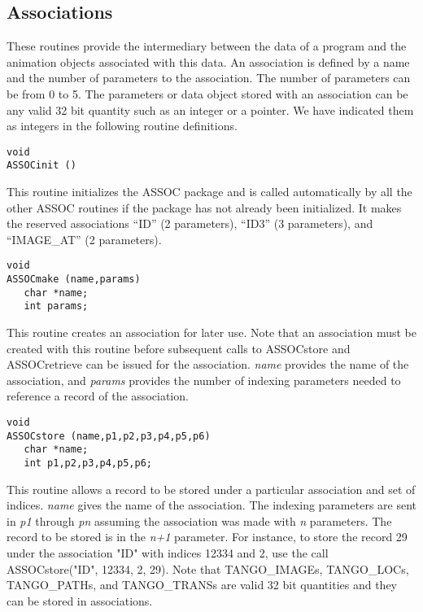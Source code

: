 \subsection{Associations}
These routines provide the intermediary between the data of a program and the
animation objects associated with this data.  An association is defined by a
name and the number of parameters to the association.  The number of
parameters can be from 0 to 5.  The parameters or data object stored
with an association can be any valid 32 bit quantity such as an integer or a
pointer.  We have indicated them as integers in the following routine
definitions.

\vspace{1em}
\begin{verbatim}
void
ASSOCinit () 
\end{verbatim}
This routine initializes the ASSOC package and is called automatically by all
the other ASSOC routines if the package has not already been initialized.
It makes the reserved associations ``ID'' (2 parameters), ``ID3''
(3 parameters), and ``IMAGE\_AT'' (2 parameters).

\vspace{1em}
\begin{verbatim}
void
ASSOCmake (name,params) 
   char *name;
   int params;
\end{verbatim}
This routine creates an association for later use.  Note that an association
must be created with this routine before subsequent calls to ASSOCstore and
ASSOCretrieve can be issued for the association.  {\em name} provides the name
of the association, and {\em params} provides the number of indexing
parameters needed to reference a record of the association.

\vspace{1em}
\begin{verbatim}
void
ASSOCstore (name,p1,p2,p3,p4,p5,p6) 
   char *name;
   int p1,p2,p3,p4,p5,p6;
\end{verbatim}
This routine allows a record to be stored under a particular association and
set of indices.  {\em name} gives the name of the association.  The indexing
parameters are sent in {\em p1} through {\em pn} assuming the association was
made with {\em n} parameters.  The record to be stored is in the
{\em n+1}
parameter.  For instance, to store the record 29 under the association "ID"
with indices 12334 and 2, use the call ASSOCstore("ID", 12334, 2, 29).
Note that TANGO\_IMAGEs, TANGO\_LOCs, TANGO\_PATHs, and TANGO\_TRANSs
are valid 32 bit quantities and they can be stored in associations.

